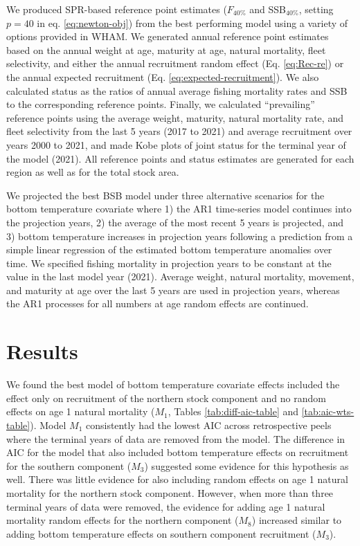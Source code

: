 \documentclass[
]{article}
\begin{document}
We produced SPR-based reference point estimates (\(F_{40\%}\) and SSB\(_{40\%}\), setting \(p=40\) in eq. \ref{eq:newton-obj}) from the best performing model using a variety of options provided in WHAM. We generated annual reference point estimates based on the annual weight at age, maturity at age, natural mortality, fleet selectivity, and either the annual recruitment random effect (Eq. \ref{eq:Rec-re}) or the annual expected recruitment (Eq. \ref{eq:expected-recruitment}). We also calculated status as the ratios of annual average fishing mortality rates and SSB to the corresponding reference points. Finally, we calculated ``prevailing'' reference points using the average weight, maturity, natural mortality rate, and fleet selectivity from the last 5 years (2017 to 2021) and average recruitment over years 2000 to 2021, and made Kobe plots of joint status for the terminal year of the model (2021). All reference points and status estimates are generated for each region as well as for the total stock area.

We projected the best BSB model under three alternative scenarios for the bottom temperature covariate where 1) the AR1 time-series model continues into the projection years, 2) the average of the most recent 5 years is projected, and 3) bottom temperature increases in projection years following a prediction from a simple linear regression of the estimated bottom temperature anomalies over time. We specified fishing mortality in projection years to be constant at the value in the last model year (2021). Average weight, natural mortality, movement, and maturity at age over the last 5 years are used in projection years, whereas the AR1 processes for all numbers at age random effects are continued.

\hypertarget{results}{%
\section*{Results}\label{results}}

We found the best model of bottom temperature covariate effects included the effect only on recruitment of the northern stock component and no random effects on age 1 natural mortality (\(M_1\), Tables \ref{tab:diff-aic-table} and \ref{tab:aic-wts-table}). Model \(M_1\) consistently had the lowest AIC across retrospective peels where the terminal years of data are removed from the model. The difference in AIC for the model that also included bottom temperature effects on recruitment for the southern component (\(M_3\)) suggested some evidence for this hypothesis as well. There was little evidence for also including random effects on age 1 natural mortality for the northern stock component. However, when more than three terminal years of data were removed, the evidence for adding age 1 natural mortality random effects for the northern component (\(M_8\)) increased similar to adding bottom temperature effects on southern component recruitment (\(M_3\)).
\end{document}
